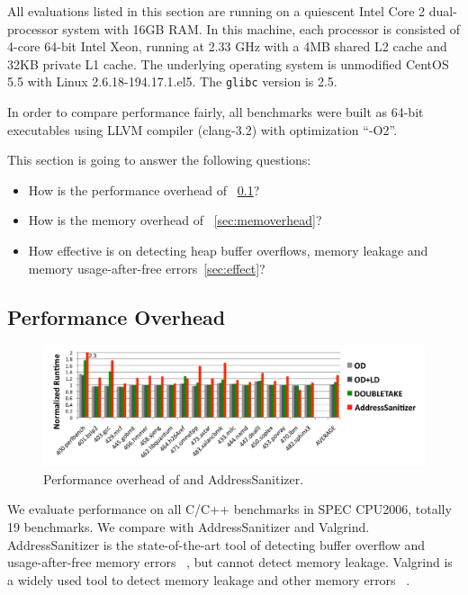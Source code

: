 \label{sec:evaluation}

All evaluations listed in this section are running 
on a quiescent Intel Core 2 dual-processor system with 16GB RAM. In this machine, each processor is consisted of 4-core 64-bit Intel Xeon, running at 2.33 GHz with a 4MB shared L2 cache and 32KB private L1 cache. The underlying operating system is unmodified CentOS 5.5 with Linux 2.6.18-194.17.1.el5. The \texttt{glibc} version is 2.5.

In order to compare performance fairly, all benchmarks were built as 64-bit executables using LLVM compiler (clang-3.2) with optimization ``-O2''. 

This section is going to answer the following questions:
\begin{itemize}
\item
How is the performance overhead of \doubletake{} ~\ref{sec:perf}?

\item
How is the memory overhead of \doubletake{}~\ref{sec:memoverhead}?

\item
How effective is \doubletake{} on detecting heap buffer overflows, memory leakage and memory usage-after-free errors~\ref{sec:effect}? 


\end{itemize}

\subsection{Performance Overhead}
\label{sec:perf}

\begin{figure}[ht]
\begin{center}
\includegraphics[width=6.5in]{figure/perf}
\end{center}
\caption{
Performance overhead of \doubletake{} and AddressSanitizer.
\label{fig:perf}}
\end{figure}

We evaluate performance on all C/C++ benchmarks in SPEC CPU2006, totally 19 benchmarks. We compare \doubletake{} with AddressSanitizer and Valgrind. AddressSanitizer is the state-of-the-art tool of detecting buffer overflow and usage-after-free memory errors ~\cite{AddressSanitizer}, but cannot detect memory leakage. Valgrind is a widely used tool to detect memory leakage and other memory errors ~\cite{overflow:valgrind}. 

